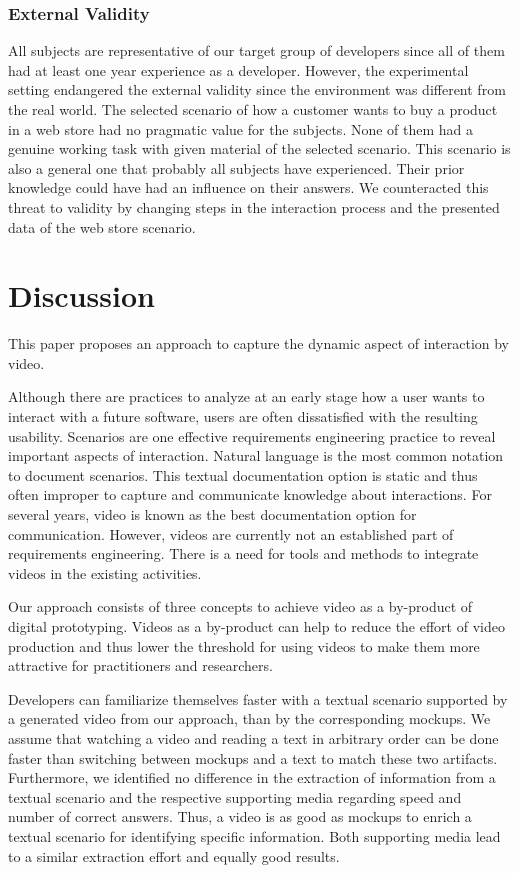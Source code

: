 \documentclass[conference]{IEEEtran}
\begin{document}
\subsubsection{External Validity}
All subjects are representative of our target group of developers since all of 
them had at least one year experience as a developer. However, the experimental 
setting endangered the external validity since the environment was different 
from the real world. The selected scenario of how a customer wants to buy a 
product in a web store had no pragmatic value for the subjects. None of them 
had a genuine working task with given material of the selected scenario. This 
scenario is also a general one that probably all subjects have experienced. 
Their prior knowledge could have had an influence on their answers. We 
counteracted this threat to validity by changing steps in the interaction 
process and the presented data of the web store scenario.

\section{Discussion}
\label{ch:discussion}
This paper proposes an approach to capture the dynamic aspect of interaction by 
video.

Although there are practices to analyze at an early stage how a user wants to 
interact with a future software, users are often dissatisfied with the 
resulting usability. Scenarios are one effective requirements engineering 
practice to reveal important aspects of interaction. Natural language is the 
most common notation to document scenarios. This textual documentation option 
is static and thus often improper to capture and communicate knowledge about 
interactions. For several years, video is known as the best documentation 
option for communication. However, videos are currently not an established part 
of requirements engineering. There is a need for tools and methods to integrate 
videos in the existing activities.

Our approach consists of three concepts to achieve video as a by-product of 
digital prototyping. Videos as a by-product can help to reduce the effort of 
video production and thus lower the threshold for using videos to make them 
more attractive for practitioners and researchers. 

Developers can familiarize themselves faster with a textual scenario supported 
by a generated video from our approach, than by the corresponding mockups. We 
assume that watching a video and reading a text in arbitrary order can be done 
faster than switching between mockups and a text to match these two artifacts. 
Furthermore, we identified no difference in the extraction of information from 
a textual scenario and the respective supporting media regarding speed and 
number of correct answers. Thus, a video is as good as mockups to enrich a 
textual scenario for identifying specific information. Both supporting media 
lead to a similar extraction effort and equally good results.
\end{document}
